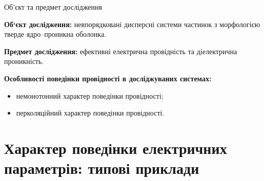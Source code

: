 \documentclass[10pt]{beamer}
\begin{document}
\begin{frame}{Об'єкт та предмет дослідження}
    
  \textbf{Об`єкт дослідження:} невпорядковані дисперсні системи частинок з морфологією тверде ядро--проникна оболонка.

  \textbf{Предмет дослідження:} ефективні електрична провідність та діелектрична проникність. 
  
  \textbf{Особливості поведінки провідності в досліджуваних системах:}
  \begin{itemize}
    \item немонотонний характер поведінки провідності;
    \item перколяційний характер поведінки провідності.
  \end{itemize}
\end{frame}


\section{Характер поведінки електричних параметрів: типові приклади}%
\end{document}
